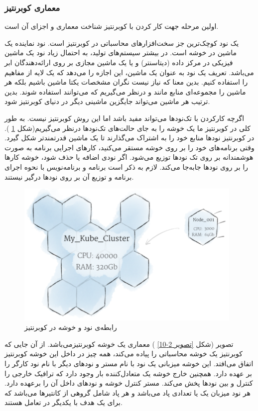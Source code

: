 \newpage

\subsubsection{معماری کوبرنتیز}
اولین مرحله جهت کار کردن با کوبرنتیز شناخت معماری و اجزای آن است.

یک نود کوچک‌ترین جز سخت‌افزارهای محاسباتی در کوبرنتیز است. نود نماینده یک ماشین در خوشه است. در بیشتر سیستم‌های تولید، به احتمال زیاد نود یک ماشین فیزیکی در مرکز داده (‌دیتاسنتر) و یا یک ماشین مجازی بر روی ارائه‌دهندگان ابر می‌باشد. تعریف یک نود به عنوان یک ماشین، ‌این اجازه را می‌دهد که یک لایه از مفاهیم را استفاده  کنیم. بدین معنا که نیاز نیست نگران مشخصات یکتا ماشین باشیم بلکه هر ماشین را مجموعه‌ای منابع مانند 
و
درنظر می‌گیریم که می‌توانند استفاده شوند. بدین ترتیب هر ماشین می‌تواند جایگزین ماشینی دیگر در دنیای کوبرنتیز شود.

اگرچه کارکردن با تک‌نودها می‌تواند مفید باشد اما این روش کوبرنتیز نیست. به طور کلی در کوبرنتیز ما یک خوشه را به جای حالت‌های تک‌نودها درنظر می‌گیریم(شکل
\ref{تصویر 2-9}
). در کوبرنتیز نودها منابع خود را به اشتراک می‌گذارند تا یک ماشین قدرتمند‌تر شکل گیرد. وقتی برنامه‌های خود را بر روی خوشه مستقر می‌کنید، کارهای اجرایی برنامه به صورت هوشمندانه بر روی تک نودها توزیع می‌شود. اگر نودی اضافه یا حذف شود، خوشه کارها را بر روی نودها  جابه‌جا می‌کند. لازم به ذکر است برنامه و برنامه‌نویس با نحوه اجرای برنامه و توزیع آن بر روی نودها درگیر نیستند.

\begin{figure}[!h]
	\centering
	\includegraphics[height=7cm]{fig2-9}
	\caption{رابطه‌ی نود و خوشه در کوبرنتیز}
	\label{تصویر 2-9}
\end{figure}

تصویر (شکل 
\ref{تصویر 2-10}
)
معماری یک خوشه کوبرنتیزمی‌باشد. از آن جایی که کوبرنتیز یک خوشه محاسباتی را پیاده می‌کند، همه چیز در داخل این خوشه کوبرنتیز اتفاق می‌افتد. این خوشه میزبانی یک نود با نام مستر و نودهای دیگر با نام نود کارگر را بر عهده دارد. همچنین خارج خوشه یک متعادل‌کننده بار وجود دارد که ترافیک خارجی را کنترل و بین نودها پخش می‌کند.  مستر کنترل خوشه و نودهای داخل آن را برعهده دارد. هر نود میزبان یک یا تعدادی پاد می‌باشد و هر پاد شامل گروهی از کانتیرها می‌باشد که برای یک هدف با یکدیگر در تعامل هستند.

